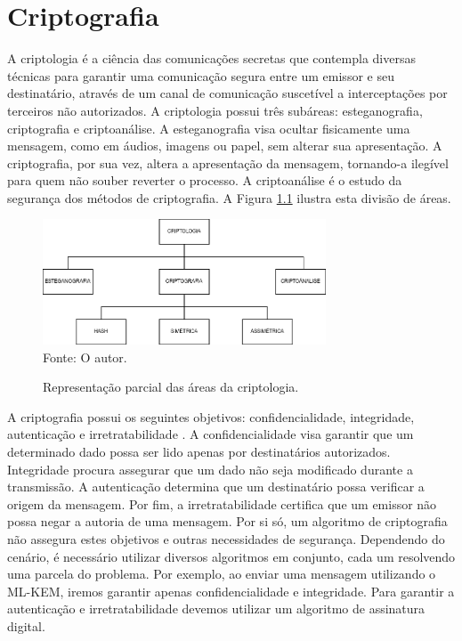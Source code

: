 \chapter{Criptografia}
\label{cap:criptografia}

A criptologia é a ciência das comunicações secretas \cite{history_of_cryptography_and_cryptanalysis} que contempla diversas técnicas para garantir uma comunicação segura entre um emissor e seu destinatário, através de um canal de comunicação suscetível a interceptações por terceiros não autorizados. A criptologia possui três subáreas: esteganografia, criptografia e criptoanálise. A esteganografia visa ocultar fisicamente uma mensagem, como em áudios, imagens ou papel, sem alterar sua apresentação. A criptografia, por sua vez, altera a apresentação da mensagem, tornando-a ilegível para quem não souber reverter o processo. A criptoanálise é o estudo da segurança dos métodos de criptografia. A Figura \ref{fig:criptologia} ilustra esta divisão de áreas.
 
    \begin{figure}[htb!]
        \centering
        \caption{Representação parcial das áreas da criptologia.}
        \includegraphics[width=0.75\textwidth]{Figuras/criptologia.png}\\
        \footnotesize{Fonte: O autor.}
        \label{fig:criptologia}
    \end{figure}

A criptografia possui os seguintes objetivos: confidencialidade, integridade, autenticação e irretratabilidade \cite{introduction_to_cryptography}. A confidencialidade visa garantir que um determinado dado possa ser lido apenas por destinatários autorizados. Integridade procura assegurar que um dado não seja modificado durante a transmissão. A autenticação determina que um destinatário possa verificar a origem da mensagem. Por fim, a irretratabilidade certifica que um emissor não possa negar a autoria de uma mensagem. Por si só, um algoritmo de criptografia não assegura estes objetivos e outras necessidades de segurança. Dependendo do cenário, é necessário utilizar diversos algoritmos em conjunto, cada um resolvendo uma parcela do problema. Por exemplo, ao enviar uma mensagem utilizando o \ac{ML-KEM}, iremos garantir apenas confidencialidade e integridade. Para garantir a autenticação e irretratabilidade devemos utilizar um algoritmo de assinatura digital.

